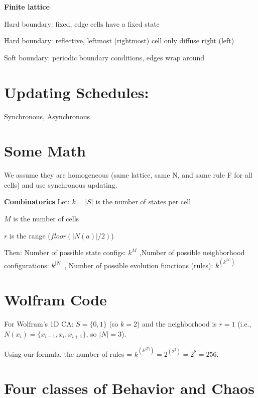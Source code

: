 \textbf{Finite lattice}
\begin{tightitemize}
    \item Hard boundary: fixed, edge cells have a fixed state
    \item Hard boundary: reflective, leftmost (rightmost) cell only diffuse right (left)
    \item Soft boundary: periodic boundary conditions, edges wrap around
\end{tightitemize}

\section*{Updating Schedules:} Synchronous, Asynchronous

\section*{Some Math}
We assume they are homogeneous (same lattice, same N, and same rule F for all cells)
and use synchronous updating.

\textbf{Combinatorics}
Let:
$k = |S|$ is the number of states per cell

$M$ is the number of cells

$r$ is the range ($floor(|N(a)|/2)$)

Then:
Number of possible state configs: $k^{M}$
,Number of possible neighborhood configurations: $k^{|N|}$
, Number of possible evolution functions (rules): $k^{\left(k^{|N|}\right)}$


\section*{Wolfram Code}

For Wolfram's 1D CA: $S = \{0, 1\}$ (so $k=2$) and the neighborhood is $r=1$ (i.e., $N(x_i) = \{x_{i-1}, x_i, x_{i+1}\}$, so $|N|=3$).

Using our formula, the number of rules = $k^{\left(k^{|N|}\right)} = 2^{\left(2^3\right)} = 2^8 = 256$.


\section*{Four classes of Behavior and Chaos}

